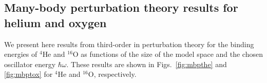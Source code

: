 \subsection{Many-body perturbation theory results for helium and oxygen}
We present here results from third-order in perturbation theory for the 
binding energies of $^{4}$He and $^{16}$O as functions of the size of the model
space and the chosen oscillator energy $\hbar\omega$.
These results are shown in Figs.~\ref{fig:mbpthe} and \ref{fig:mbptox} for 
$^{4}$He and $^{16}$O, respectively.



